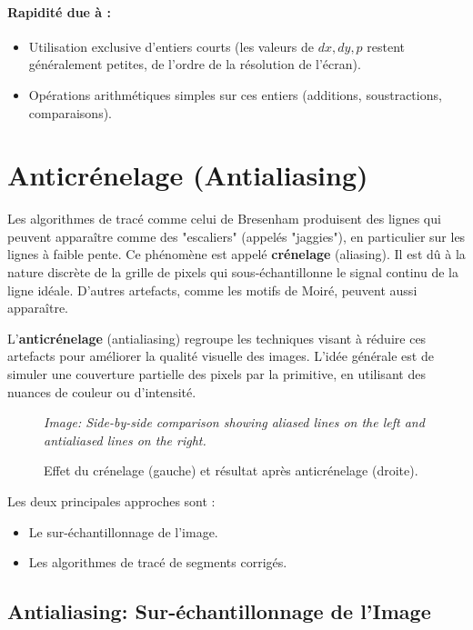 \documentclass{article}
\begin{document}
\paragraph{Rapidité due à :}
\begin{itemize}
    \item Utilisation exclusive d'entiers courts (les valeurs de $dx, dy, p$ restent généralement petites, de l'ordre de la résolution de l'écran).
    \item Opérations arithmétiques simples sur ces entiers (additions, soustractions, comparaisons).
\end{itemize}

\section{Anticrénelage (Antialiasing)}

Les algorithmes de tracé comme celui de Bresenham produisent des lignes qui peuvent apparaître comme des "escaliers" (appelés "jaggies"), en particulier sur les lignes à faible pente. Ce phénomène est appelé \textbf{crénelage} (aliasing). Il est dû à la nature discrète de la grille de pixels qui sous-échantillonne le signal continu de la ligne idéale. D'autres artefacts, comme les motifs de Moiré, peuvent aussi apparaître.

L'\textbf{anticrénelage} (antialiasing) regroupe les techniques visant à réduire ces artefacts pour améliorer la qualité visuelle des images. L'idée générale est de simuler une couverture partielle des pixels par la primitive, en utilisant des nuances de couleur ou d'intensité.

\begin{figure}[H]
\centering
\textit{Image: Side-by-side comparison showing aliased lines on the left and antialiased lines on the right.}
\caption{Effet du crénelage (gauche) et résultat après anticrénelage (droite).}
\label{fig:aliasing_vs_antialiasing}
\end{figure}

Les deux principales approches sont :
\begin{itemize}
    \item Le sur-échantillonnage de l'image.
    \item Les algorithmes de tracé de segments corrigés.
\end{itemize}

\subsection{Antialiasing: Sur-échantillonnage de l'Image}
\end{document}
